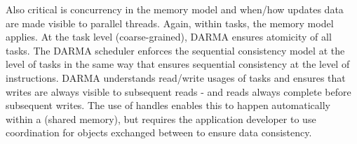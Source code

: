 Also critical is concurrency in the \gls{memory model} and when/how updates data are made visible to parallel threads.  
Again, within tasks, the \CC{} \gls{memory model} applies. 
At the task level (coarse-grained), \gls{DARMA} ensures atomicity of all tasks. 
The \gls{DARMA} scheduler enforces the \CC{} sequential consistency model at
the level of tasks in the same way that \CC{} ensures sequential consistency at the level of instructions. 
\gls{DARMA} understands read/write usages of tasks and ensures that writes are always visible to subsequent reads - and reads always complete before subsequent writes.  
The use of \glspl{handle} enables this to happen automatically within a
(shared memory), but requires the application developer to use coordination
for objects exchanged between  to ensure data consistency.




